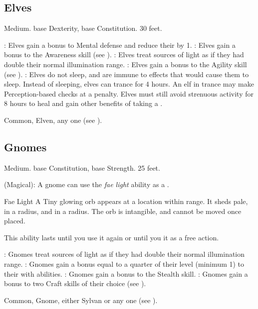 \subsection{Elves}
 Medium.
  base Dexterity,  base Constitution.
 30 feet.
\begin{itemize}
    : Elves gain a  bonus to Mental defense and reduce their  by 1.
    : Elves gain a  bonus to the Awareness skill (see ).
    : Elves treat sources of light as if they had double their normal illumination range.
    : Elves gain a  bonus to the Agility skill (see ).
    : Elves do not sleep, and are immune to  effects that would cause them to sleep.
        Instead of sleeping, elves can trance for 4 hours.
        An elf in trance may make Perception-based checks at a  penalty.
        Elves must still avoid strenuous activity for 8 hours to heal and gain other benefits of taking a .
\end{itemize}
 Common, Elven, any one  (see ).

\subsection{Gnomes}
 Medium.
  base Constitution,  base Strength.
 25 feet.
\begin{itemize}
     (Magical): A gnome can use the \textit{fae light} ability as a .
        \begin{freeability}{Fae Light}
            A Tiny glowing orb appears at a location within \rngmed range.
            It sheds pale,  in a \areasmall radius, and  in a \areamed radius.
            The orb is intangible, and cannot be moved once placed.

            This ability lasts until you use it again or until you  it as a free action.
        \end{freeability}
    : Gnomes treat sources of light as if they had double their normal illumination range.
    : Gnomes gain a bonus equal to a quarter of their level (minimum 1) to their  with  abilities.
    : Gnomes gain a  bonus to the Stealth skill.
    : Gnomes gain a  bonus to two Craft skills of their choice (see ).
\end{itemize}
 Common, Gnome, either Sylvan or any one  (see ).

